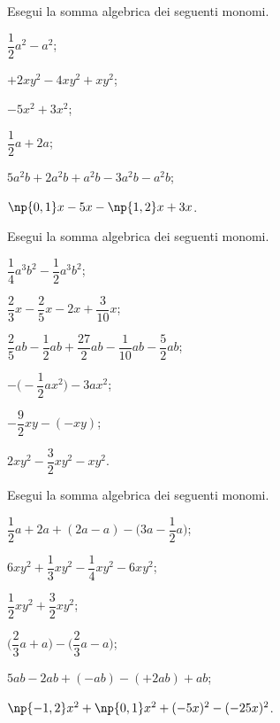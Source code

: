 \begin{esercizio}
 \label{ese:10.27} %
Esegui la somma algebrica dei seguenti monomi.
\begin{multicols}{2}
\begin{enumeratea}
 \item $\dfrac{1}{2}a^{2}-a^{2}$;
 \item $+2xy^{2}-4xy^{2}+xy^{2}$;
 \item $-5x^{2}+3x^{2}$;
 \item $\dfrac{1}{2}a+2a$;
 \item $5a^{2}b+2a^{2}b+a^{2}b-3a^{2}b-a^{2}b$;
 \item $\np{0,1}x-5x-\np{1,2}x+3x$.
\end{enumeratea}
\end{multicols}
\end{esercizio}

\begin{esercizio}[\Ast]
 \label{ese:10.28} %
Esegui la somma algebrica dei seguenti monomi.
\begin{multicols}{2}
\begin{enumeratea}
\spazielenx
 \item $\dfrac{1}{4}a^{3}b^{2}-\dfrac{1}{2}a^{3}b^{2}$;
 \item $\dfrac{2}{3}x-\dfrac{2}{5}x-2x+\dfrac{3}{10}x$;
 \item $\dfrac{2}{5}ab-\dfrac{1}{2}ab+\dfrac{27}{2}ab-\dfrac{1}{10}ab-\dfrac{5}{2}ab$;
 \item $-\bigg(-{\dfrac{1}{2}}ax^{2}\bigg)-3ax^{2}$;
 \item $-{\dfrac{9}{2}}xy-(-xy)$;
 \item $2xy^{2}-\dfrac{3}{2}xy^{2}-xy^{2}$.
\end{enumeratea}
\end{multicols}
\end{esercizio}

\begin{esercizio}[\Ast]
 \label{ese:10.29} %
Esegui la somma algebrica dei seguenti monomi.
\begin{multicols}{2}
\begin{enumeratea}
\spazielenx
 \item $\dfrac{1}{2}a+2a+(2a-a)-\bigg(3a-\dfrac{1}{2}a\bigg)$;
 \item $6xy^{2}+\dfrac{1}{3}xy^{2}-\dfrac{1}{4}xy^{2}-6xy^{2}$;
 \item $\dfrac{1}{2}xy^{2}+\dfrac{3}{2}xy^{2}$;
 \item $\bigg(\dfrac{2}{3}a+a\bigg)-\bigg(\dfrac{2}{3}a-a\bigg)$;
 \item $5ab-2ab+(-ab)-(+2ab)+ab$;
 \item $\np{-1,2}x^{2}+\np{0,1}x^{2}+(-5x)^{2}-(-25x)^{2}$.
\end{enumeratea}
\end{multicols}

\end{esercizio}


